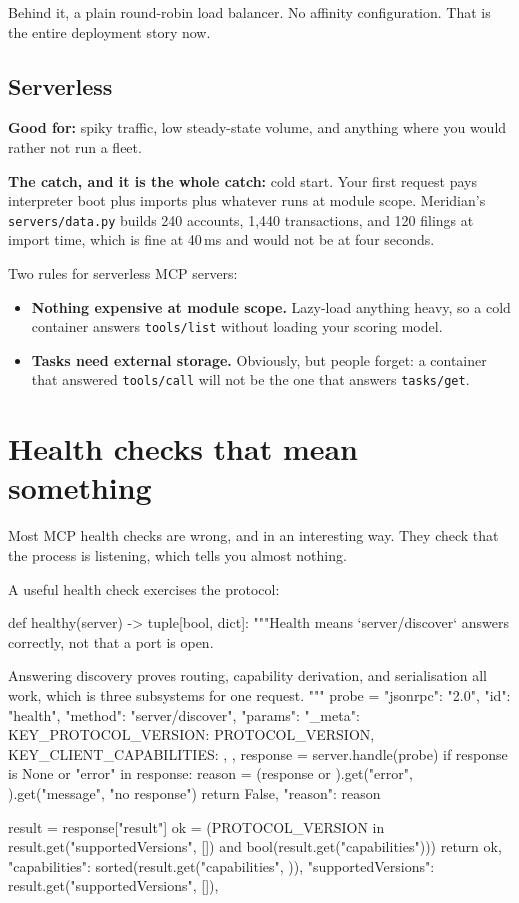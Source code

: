 Behind it, a plain round-robin load balancer. No affinity configuration. That is
the entire deployment story now.

\subsection{Serverless}

\textbf{Good for:} spiky traffic, low steady-state volume, and anything where you
would rather not run a fleet.

\textbf{The catch, and it is the whole catch:} cold start. Your first request
pays interpreter boot plus imports plus whatever runs at module scope. Meridian's
\texttt{servers/data.py} builds 240 accounts, 1,440 transactions, and 120 filings
at import time, which is fine at 40\,ms and would not be at four seconds.

Two rules for serverless MCP servers:

\begin{itemize}[leftmargin=1.6em, itemsep=3pt]
\item \textbf{Nothing expensive at module scope.} Lazy-load anything heavy, so a
cold container answers \texttt{tools/list} without loading your scoring model.
\item \textbf{Tasks need external storage.} Obviously, but people forget: a
container that answered \texttt{tools/call} will not be the one that answers
\texttt{tasks/get}.
\end{itemize}

\section{Health checks that mean something}

Most MCP health checks are wrong, and in an interesting way. They check that the
process is listening, which tells you almost nothing.

A useful health check exercises the protocol:

\begin{py}
def healthy(server) -> tuple[bool, dict]:
    """Health means `server/discover` answers correctly, not that a port is open.

    Answering discovery proves routing, capability derivation, and
    serialisation all work, which is three subsystems for one request.
    """
    probe = {
        "jsonrpc": "2.0", "id": "health", "method": "server/discover",
        "params": {"_meta": {
            KEY_PROTOCOL_VERSION: PROTOCOL_VERSION,
            KEY_CLIENT_CAPABILITIES: {},
        }},
    }
    response = server.handle(probe)
    if response is None or "error" in response:
        reason = (response or {}).get("error", {}).get("message", "no response")
        return False, {"reason": reason}

    result = response["result"]
    ok = (PROTOCOL_VERSION in result.get("supportedVersions", [])
          and bool(result.get("capabilities")))
    return ok, {
        "capabilities": sorted(result.get("capabilities", {})),
        "supportedVersions": result.get("supportedVersions", []),
    }
\end{py}

